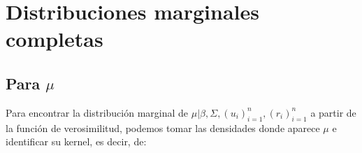 

\section{Distribuciones marginales completas}

\subsection{Para $\mu$}
Para encontrar la distribución marginal de $\mu|\beta,\Sigma,(u_{i})_{i=1}^{n},(r_{i})_{i=1}^{n}$ a partir de la función de verosimilitud, podemos tomar las densidades donde aparece $\mu$ e identificar su kernel, es decir, de: 

